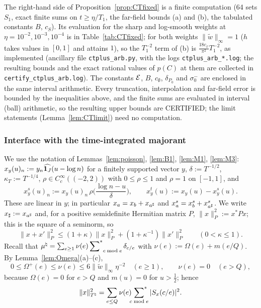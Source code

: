 The right-hand side of Proposition~\ref{prop:CTfixed} is a finite computation (64 sets $S_1$, exact finite sums on
$t\ge\eta/T_1$, the far-field bounds (a) and (b), the tabulated constants $B$, $c_S$). Its evaluation for the sharp and log-smooth weights at $\eta=10^{-2},10^{-3},10^{-4}$ is
in Table~\ref{tab:CTfixed}; for both weights $\|\widetilde w\|_\infty=1$ ($h$ takes values in $[0,1]$ and attains $1$), so the
$T_1^{-2}$ term of (b) is $\frac{18c_\varphi}{\pi^2}T_1^{-2}$, as implemented (ancillary file \texttt{ctplus\_arb.py}, with the logs \texttt{ctplus\_arb\_*.log}; the resulting bounds and the
exact rational values of $p(C)$ at them are collected in \texttt{certify\_ctplus\_arb.log}). The constants $\mathcal{E}$, $B$, $c_\emptyset$, $\delta_{P_0}$ and
$\sigma_0^-$ are enclosed in the same interval arithmetic. Every truncation, interpolation and far-field error is bounded
by the inequalities above, and the finite sums are evaluated in interval (ball) arithmetic, so the resulting upper bounds are CERTIFIED;
the limit statements (Lemma~\ref{lem:CTlimit}) need no computation.

\subsubsection*{Interface with the time-integrated majorant}

We use the notation of Lemmas~\ref{lem:poisson}, \ref{lem:B1}, \ref{lem:M1}, \ref{lem:M3}: $x_y(u)_n:=y_n\widehat{\mathbf 1_J}(u-\log n)$ for a finitely
supported vector $y$, $\delta:=T^{-1/2}$, $\kappa_T:=T^{-1/4}$, $\rho\in C_c^\infty((-2,2))$ with $0\le\rho\le1$ and $\rho=1$ on $[-1,1]$, and
\[
 x_y^s(u)_n:=x_y(u)_n\,\rho\Big(\frac{\log n-u}\delta\Big),\qquad x_y^t(u):=x_y(u)-x_y^s(u).
\]
These are linear in $y$; in particular $x_a=x_b+x_{a^\sharp}$ and $x_a^s=x_b^s+x_{a^\sharp}^s$. We write $x_\sharp:=x_{a^\sharp}$ and, for a positive
semidefinite Hermitian matrix $P$, $\|x\|_P^2:=x^*Px$; this is the square of a seminorm, so
\begin{equation}\label{eqC:seminorm}
 \|x+x'\|_P^2\le(1+\kappa)\|x\|_P^2+(1+\kappa^{-1})\|x'\|_P^2\qquad(0<\kappa\le1).
\end{equation}
Recall that $\mu^\natural=\sum_{e\ge1}\nu(e)\sideset{}{^*}\sum_{c\bmod e}\delta_{c/e}$ with $\nu(e):=\Omega(e)+m(e/Q)$. By Lemma~\ref{lem:Omega}(a)--(c),
\begin{equation}\label{eqC:nu}
 0\le\Omega^+(e)\le\nu(e)\le6\|\widetilde w\|_\infty\eta^{-2}\quad(e\ge1),\qquad \nu(e)=0\quad(e>Q),
\end{equation}
because $\Omega(e)=0$ for $e>Q$ and $m(u)=0$ for $u>\frac12$; hence
\[
 \|x\|_{T^\natural}^2=\sum_{e\le Q}\nu(e)\sideset{}{^*}\sum_{c\bmod e}|S_x(c/e)|^2 .
\]

